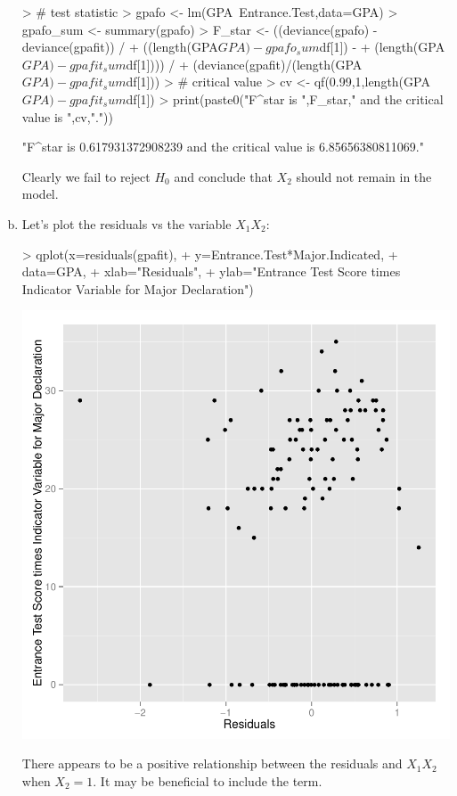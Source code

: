 \documentclass{article}
\begin{document}
\begin{enumerate}[a)]
\begin{Schunk}
\begin{Sinput}
> # test statistic
> gpafo <- lm(GPA~Entrance.Test,data=GPA)
> gpafo_sum <- summary(gpafo)
> F_star <- ((deviance(gpafo) - deviance(gpafit)) /
+   ((length(GPA$GPA) - gpafo_sum$df[1]) - 
+      (length(GPA$GPA) - gpafit_sum$df[1]))) /
+   (deviance(gpafit)/(length(GPA$GPA) - gpafit_sum$df[1]))
> # critical value
> cv <- qf(0.99,1,length(GPA$GPA)-gpafit_sum$df[1])
> print(paste0("F^star is ",F_star," and the critical value is ",cv,"."))
\end{Sinput}
\begin{Soutput}
[1] "F^star is 0.617931372908239 and the critical value is 6.85656380811069."
\end{Soutput}
\end{Schunk}

Clearly we fail to reject $H_0$ and conclude that $X_2$ should not remain in the model.

\item{} Let's plot the residuals vs the variable $X_1X_2$:

\begin{Schunk}
\begin{Sinput}
> qplot(x=residuals(gpafit),
+       y=Entrance.Test*Major.Indicated,
+       data=GPA,
+       xlab="Residuals",
+       ylab="Entrance Test Score times Indicator Variable for Major Declaration")
\end{Sinput}
\end{Schunk}
\includegraphics{Fig-moreresplots}

There appears to be a positive relationship between the residuals and $X_1X_2$ when $X_2 = 1$. It may be beneficial to include the term.

\end{enumerate}
\end{document}
